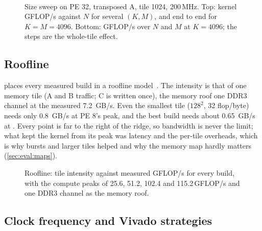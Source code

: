 \begin{figure}[ht]
  \centering
  \begin{subfigure}[b]{\linewidth}\centering\end{subfigure}\\[3mm]
  \begin{subfigure}[b]{\linewidth}\centering\end{subfigure}
  \caption{Size sweep on PE 32, transposed A, tile 1024, 200\,MHz. Top: kernel GFLOP/s against \(N\) for
    several \((K, M)\), and end to end for \(K = M = 4096\). Bottom: GFLOP/s over \(N\) and \(M\) at \(K = 4096\);
    the steps are the whole-tile effect.}
  \label{fig:size}
\end{figure}

\subsection{Roofline}
\label{sec:eval:roofline}
 places every measured build in a roofline model~\cite{roofline}. The intensity is that of one
memory tile (A and B traffic; C is written once), the memory roof one DDR3 channel at the measured \SI{7.2}{GB/s}.
Even the smallest tile (\(128^2\), 32 flop/byte) needs only \SI{0.8}{GB/s} at PE 8's peak, and the best build
needs about \SI{0.65}{GB/s} at . Every point is far to the right of the ridge, so bandwidth is never
the limit; what kept the kernel from its peak was latency and the per-tile overheads, which is why
bursts and larger tiles helped and why the memory map hardly matters (\cref{sec:eval:maps}).

\begin{figure}[ht]
  \centering
  
  \caption{Roofline: tile intensity against measured GFLOP/s for every build, with the compute peaks of 25.6, 51.2,
    102.4 and 115.2\,GFLOP/s and one DDR3 channel as the memory roof.}
  \label{fig:roofline}
\end{figure}

\subsection{Clock frequency and Vivado strategies}
\label{sec:eval:timing}
